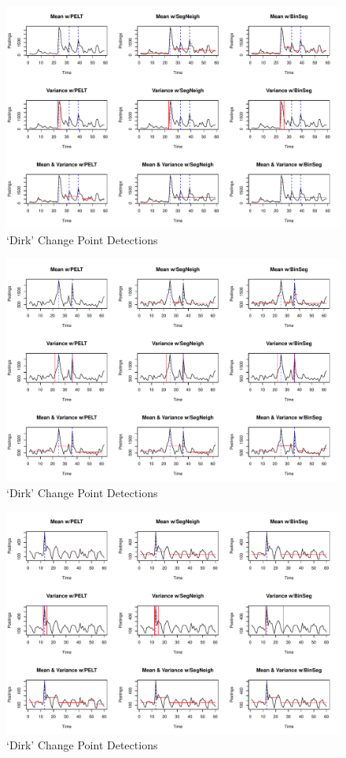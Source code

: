 \documentclass{uvamscse}	%
\begin{document}
\begin{figure}[h]
    \includegraphics[width=\textwidth]{figures/dapresults}
    \caption{`Dirk' Change Point Detections}
    \label{fig:dap}
\end{figure}

\begin{figure}[h]
    \includegraphics[width=\textwidth]{figures/jumboresults}
    \caption{`Dirk' Change Point Detections}
    \label{fig:jumbo}
\end{figure}

\begin{figure}[h]
    \includegraphics[width=\textwidth]{figures/kvkresults}
    \caption{`Dirk' Change Point Detections}
    \label{fig:kvk}
\end{figure}
\end{document}
